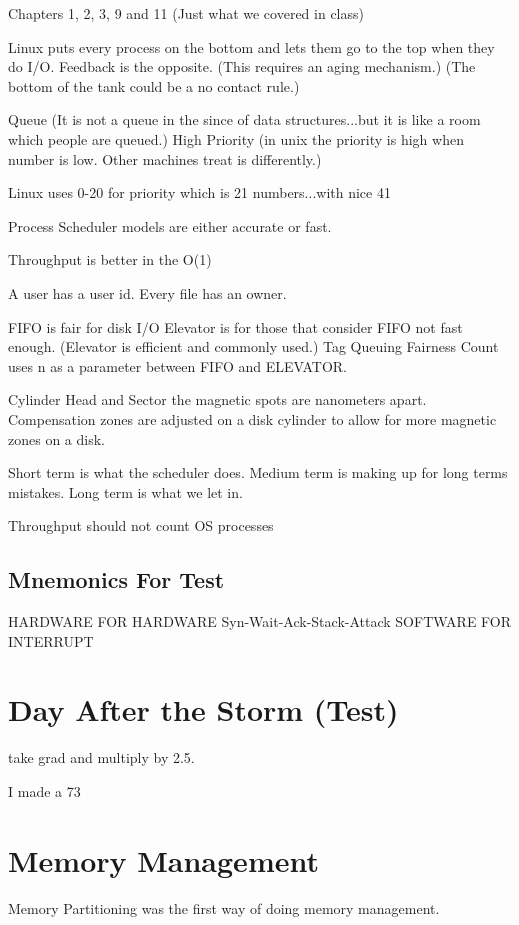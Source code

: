\documentclass{article}
\begin{document}
Chapters 1, 2, 3, 9 and 11 (Just what we covered in class)

Linux puts every process on the bottom and lets them go to the top when they do I/O.
Feedback is the opposite. (This requires an aging mechanism.) (The bottom of the tank could be a no contact rule.)


Queue (It is not a queue in the since of data structures...but it is like a room which people are queued.)
High Priority (in unix the priority is high when number is low. Other machines treat is differently.)

Linux uses 0-20 for priority which is 21 numbers...with nice 41

Process Scheduler models are either accurate or fast. 

Throughput is better in the O(1)

A user has a user id. Every file has an owner. 

FIFO is fair for disk I/O
Elevator is for those that consider FIFO not fast enough. (Elevator is efficient and commonly used.)
  Tag Queuing
Fairness Count uses n as a parameter between FIFO and ELEVATOR.

Cylinder Head and Sector
the magnetic spots are nanometers apart.
Compensation zones are adjusted on a disk cylinder to allow for more magnetic zones on a disk.

Short term is what the scheduler does.
Medium term is making up for long terms mistakes. 
Long term is what we let in.

Throughput should not count OS processes

\subsection*{Mnemonics For Test}

HARDWARE FOR HARDWARE
Syn-Wait-Ack-Stack-Attack
SOFTWARE FOR INTERRUPT

\section*{Day After the Storm (Test)}

take grad and multiply by 2.5.

I made a 73


\section*{Memory Management}

Memory Partitioning was the first way of doing memory management.
\end{document}
